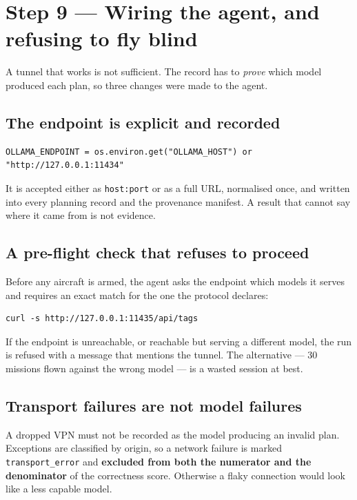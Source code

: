 \documentclass[11pt,a4paper]{article}
\begin{document}
\section{Step 9 --- Wiring the agent, and refusing to fly blind}

A tunnel that works is not sufficient. The record has to \emph{prove} which
model produced each plan, so three changes were made to the agent.

\subsection{The endpoint is explicit and recorded}

\begin{lstlisting}
OLLAMA_ENDPOINT = os.environ.get("OLLAMA_HOST") or "http://127.0.0.1:11434"
\end{lstlisting}

It is accepted either as \texttt{host:port} or as a full URL, normalised once,
and written into every planning record and the provenance manifest. A result
that cannot say where it came from is not evidence.

\subsection{A pre-flight check that refuses to proceed}

Before any aircraft is armed, the agent asks the endpoint which models it serves
and requires an exact match for the one the protocol declares:

\begin{lstlisting}
curl -s http://127.0.0.1:11435/api/tags
\end{lstlisting}

If the endpoint is unreachable, or reachable but serving a different model, the
run is refused with a message that mentions the tunnel. The alternative --- 30
missions flown against the wrong model --- is a wasted session at best.

\subsection{Transport failures are not model failures}

A dropped VPN must not be recorded as the model producing an invalid plan.
Exceptions are classified by origin, so a network failure is marked
\texttt{transport\_error} and \textbf{excluded from both the numerator and the
denominator} of the correctness score. Otherwise a flaky connection would look
like a less capable model.
\end{document}
